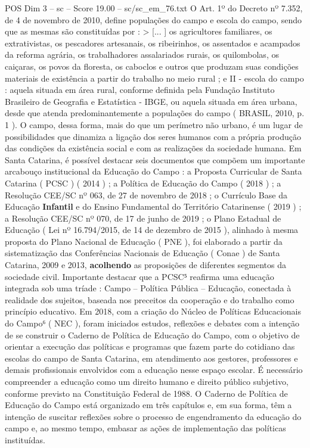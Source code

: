 \begin{textsample}{POS Dim 3 – sc – Score 19.00 – sc/sc\_em\_76.txt}
O Art. 1º do Decreto nº 7.352, de 4 de novembro de 2010, define populações do campo e escola do campo, sendo que as mesmas são constituídas por : > [... ] os agricultores familiares, os extrativistas, os pescadores artesanais, os ribeirinhos, os assentados e acampados da reforma agrária, os trabalhadores assalariados rurais, os quilombolas, os caiçaras, os povos da floresta, os caboclos e outros que produzam suas condições materiais de existência a partir do trabalho no meio rural ; e II - escola do campo : aquela situada em área rural, conforme definida pela Fundação Instituto Brasileiro de Geografia e Estatística - IBGE, ou aquela situada em área urbana, desde que atenda predominantemente a populações do campo ( BRASIL, 2010, p. 1 ).
O campo, dessa forma, mais do que um perímetro não urbano, é um lugar de possibilidades que dinamiza a ligação dos seres humanos com a própria produção das condições da existência social e com as realizações da sociedade humana.
Em Santa Catarina, é possível destacar seis documentos que compõem um importante arcabouço institucional da Educação do Campo : a Proposta Curricular de Santa Catarina ( PCSC ) ( 2014 ) ; a Política de Educação do Campo ( 2018 ) ; a Resolução CEE/SC nº 063, de 27 de novembro de 2018 ; o Currículo Base da Educação \textbf{Infantil} e do Ensino Fundamental do Território Catarinense ( 2019 ) ; a Resolução CEE/SC nº 070, de 17 de junho de 2019 ; o Plano Estadual de Educação ( Lei nº 16.794/2015, de 14 de dezembro de 2015 ), alinhado à mesma proposta do Plano Nacional de Educação ( PNE ), foi elaborado a partir da sistematização das Conferências Nacionais de Educação ( Conae ) de Santa Catarina, 2009 e 2013, \textbf{acolhendo} as proposições de diferentes segmentos da sociedade civil.
Importante destacar que a PCSC⁵ reafirma uma educação integrada sob uma tríade : Campo – Política Pública – Educação, conectada à realidade dos sujeitos, baseada nos preceitos da cooperação e do trabalho como princípio educativo.
Em 2018, com a criação do Núcleo de Políticas Educacionais do Campo⁶ ( NEC ), foram iniciados estudos, reflexões e debates com a intenção de se construir o Caderno de Política de Educação do Campo, com o objetivo de orientar a execução das políticas e programas que fazem parte do cotidiano das escolas do campo de Santa Catarina, em atendimento aos gestores, professores e demais profissionais envolvidos com a educação nesse espaço escolar.
É necessário compreender a educação como um direito humano e direito público subjetivo, conforme previsto na Constituição Federal de 1988.
O Caderno de Política de Educação do Campo está organizado em três capítulos e, em sua forma, têm a intenção de suscitar reflexões sobre o processo de engendramento da educação do campo e, ao mesmo tempo, embasar as ações de implementação das políticas instituídas.

\end{textsample}
